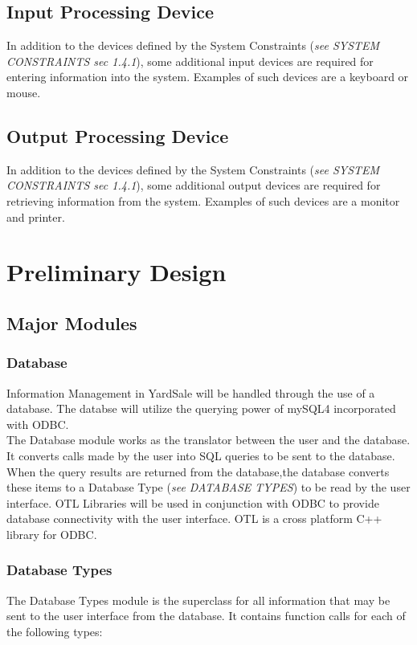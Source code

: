 \documentclass{report}
\begin{document}
	    \subsection{Input Processing Device}
		In addition to the devices defined by the System Constraints
		({\sl see SYSTEM CONSTRAINTS sec 1.4.1}), some additional input
		devices are required for entering information into the system.
		Examples of such devices are a keyboard or mouse.

	    \subsection{Output Processing Device}
		In addition to the devices defined by the System Constraints
		({\sl see SYSTEM CONSTRAINTS sec 1.4.1}), some additional output	
		devices are required for retrieving information from the system.
		Examples of such devices are a monitor and printer.

    \section{Preliminary Design}

        \subsection{Major Modules}

            \subsubsection{Database}
                Information Management in YardSale will be handled
                through the use of a database.  The databse will
                utilize the querying power of mySQL4 incorporated
                with ODBC. \\
                The Database module works as the translator between
                the user and the database.  It converts calls
                made by the user into SQL queries to be sent to the
                database.  When the query results are returned from the
                database,the database converts these items to a
                Database Type ({\sl see DATABASE TYPES}) to be read by the
                user interface. OTL Libraries will be used in conjunction with ODBC to
                provide database connectivity with the user interface. OTL is
                a cross platform C++ library for ODBC.

            \subsubsection{Database Types}
                The Database Types module is the superclass for all information that
                may be sent to the user interface from the database.  It contains
                function calls for each of the following types:
\end{document}
